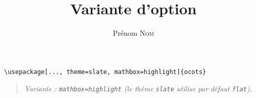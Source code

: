 \documentclass[11pt]{ocots-book}
\title{Variante d'option}
\author{Prénom \textsc{Nom}}
\newcommand{\ocotsvariantnote}[1]{\begin{quote}\itshape Variante : #1\end{quote}}
\begin{document}
\maketitle

\begin{lstlisting}
\usepackage[..., theme=slate, mathbox=highlight]{ocots}
\end{lstlisting}
\ocotsvariantnote{\texttt{mathbox=highlight} (le th\`eme \texttt{slate} utilise par d\'efaut \texttt{flat}).}

\end{document}
